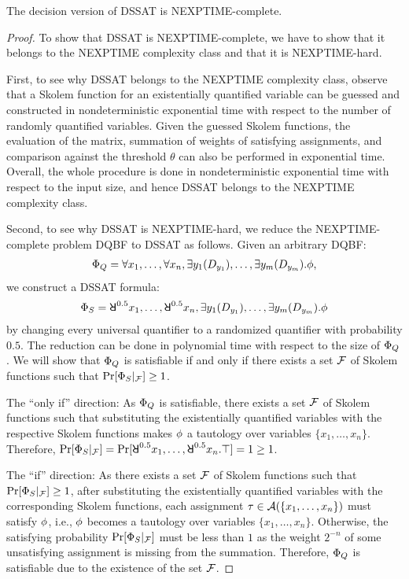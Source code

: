 \begin{theorem}
    The decision version of DSSAT is NEXPTIME-complete.
\end{theorem}
\begin{proof}
    To show that DSSAT is NEXPTIME-complete,
    we have to show that it belongs to the NEXPTIME complexity class and that it is NEXPTIME-hard.

    First, to see why DSSAT belongs to the NEXPTIME complexity class,
    observe that a Skolem function for an existentially quantified variable can be guessed and constructed in nondeterministic exponential time with respect to the number of randomly quantified variables.
    Given the guessed Skolem functions,
    the evaluation of the matrix,
    summation of weights of satisfying assignments,
    and comparison against the threshold $\theta$ can also be performed in exponential time.
    Overall, the whole procedure is done in nondeterministic exponential time with respect to the input size,
    and hence DSSAT belongs to the NEXPTIME complexity class.

    Second, to see why DSSAT is NEXPTIME-hard,
    we reduce the NEXPTIME-complete problem DQBF to DSSAT as follows.
    Given an arbitrary DQBF:
    \begin{align*}
        \Phi_Q=\forall x_1,\ldots,\forall x_n,\exists y_1(D_{y_1}),\ldots,\exists y_m(D_{y_m}).\phi,
    \end{align*}
    we construct a DSSAT formula:
    \begin{align*}
        \Qf_S=\random{0.5} x_1,\ldots,\random{0.5} x_n,\exists y_1(\dep{y_1}),\ldots,\exists y_m(\dep{y_m}).\pf
    \end{align*}
    by changing every universal quantifier to a randomized quantifier with probability $0.5$.
    The reduction can be done in polynomial time with respect to the size of $\Phi_Q$.
    We will show that $\Phi_Q$ is satisfiable if and only if there exists a set $\mathcal{F}$ of Skolem functions such that $\Pr[\Phi_S|_{\mathcal{F}}]\geq 1$.

    The ``only if'' direction:
    As $\Phi_Q$ is satisfiable,
    there exists a set $\mathcal{F}$ of Skolem functions such that
    substituting the existentially quantified variables with the respective Skolem functions
    makes $\phi$ a tautology over variables $\{x_1,\ldots,x_n\}$.
    Therefore, $\spb{\pcf{\Qf_S}{\skf}}=\spb{\random{0.5}x_1,\ldots,\random{0.5}x_n.\top}=1\geq 1$.

    The ``if'' direction:
    As there exists a set $\mathcal{F}$ of Skolem functions such that $\Pr[\Phi_S|_{\mathcal{F}}]\geq 1$,
    after substituting the existentially quantified variables with the corresponding Skolem functions,
    each assignment $\tau\in\mathcal{A}(\{x_1,\ldots,x_n\})$ must satisfy $\phi$,
    i.e., $\phi$ becomes a tautology over variables $\{x_1,\ldots,x_n\}$.
    Otherwise, the satisfying probability $\Pr[\Phi_S|_{\mathcal{F}}]$ must be less than $1$
    as the weight $2^{-n}$ of some unsatisfying assignment is missing from the summation.
    Therefore, $\Phi_Q$ is satisfiable due to the existence of the set $\mathcal{F}$.
\end{proof}

